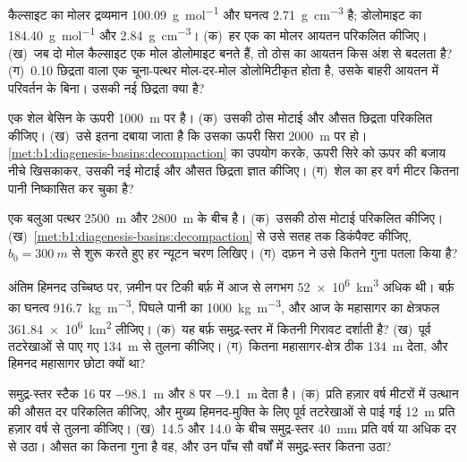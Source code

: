 \begin{exercise}[$\star$]\label{exo:b1:diagenesis-basins:4}
कैल्साइट का मोलर द्रव्यमान \qty{100.09}{g.mol^{-1}} और घनत्व \qty{2.71}{g.cm^{-3}} है; डोलोमाइट का \qty{184.40}{g.mol^{-1}} और \qty{2.84}{g.cm^{-3}}। (क)~हर एक का मोलर आयतन परिकलित कीजिए। (ख)~जब दो मोल कैल्साइट एक मोल डोलोमाइट बनते हैं, तो ठोस का आयतन किस अंश से बदलता है? (ग)~\num{0.10} छिद्रता वाला एक चूना-पत्थर मोल-दर-मोल डोलोमिटीकृत होता है, उसके बाहरी आयतन में परिवर्तन के बिना। उसकी नई छिद्रता क्या है?
\end{exercise}

\begin{exercise}[$\star\star$]\label{exo:b1:diagenesis-basins:5}
एक शेल बेसिन के ऊपरी \qty{1000}{m} पर है। (क)~उसकी ठोस मोटाई और औसत छिद्रता परिकलित कीजिए। (ख)~उसे इतना दबाया जाता है कि उसका ऊपरी सिरा \qty{2000}{m} पर हो। \cref{met:b1:diagenesis-basins:decompaction} का उपयोग करके, ऊपरी सिरे को ऊपर की बजाय नीचे खिसकाकर, उसकी नई मोटाई और औसत छिद्रता ज्ञात कीजिए। (ग)~शेल का हर वर्ग मीटर कितना पानी निष्कासित कर चुका है?
\end{exercise}

\begin{exercise}[$\star\star$]\label{exo:b1:diagenesis-basins:6}
एक बलुआ पत्थर \qty{2500}{m} और \qty{2800}{m} के बीच है। (क)~उसकी ठोस मोटाई परिकलित कीजिए। (ख)~\cref{met:b1:diagenesis-basins:decompaction} से उसे सतह तक डिकंपैक्ट कीजिए, $b_0 = \qty{300}{m}$ से शुरू करते हुए हर न्यूटन चरण लिखिए। (ग)~दफ़न ने उसे कितने गुना पतला किया है?
\end{exercise}

\begin{exercise}[$\star\star$]\label{exo:b1:diagenesis-basins:7}
अंतिम हिमनद उच्चिष्ठ पर, ज़मीन पर टिकी बर्फ़ में आज से लगभग \qty{52e6}{km^3} अधिक थी। बर्फ़ का घनत्व \qty{916.7}{kg.m^{-3}}, पिघले पानी का \qty{1000}{kg.m^{-3}}, और आज के महासागर का क्षेत्रफल \qty{361.84e6}{km^2} लीजिए। (क)~यह बर्फ़ समुद्र-स्तर में कितनी गिरावट दर्शाती है? (ख)~पूर्व तटरेखाओं से पाए गए \qty{134}{m} से तुलना कीजिए। (ग)~कितना महासागर-क्षेत्र ठीक \qty{134}{m} देता, और हिमनद महासागर छोटा क्यों था?
\end{exercise}

\begin{exercise}[$\star\star$]\label{exo:b1:diagenesis-basins:8}
समुद्र-स्तर स्टैक \qty{16}{\ka} पर \qty{-98.1}{m} और \qty{8}{\ka} पर \qty{-9.1}{m} देता है। (क)~प्रति हज़ार वर्ष मीटरों में उत्थान की औसत दर परिकलित कीजिए, और मुख्य हिमनद-मुक्ति के लिए पूर्व तटरेखाओं से पाई गई \qty{12}{m} प्रति हज़ार वर्ष से तुलना कीजिए। (ख)~\qty{14.5}{\ka} और \qty{14.0}{\ka} के बीच समुद्र-स्तर \qty{40}{mm} प्रति वर्ष या अधिक दर से उठा। औसत का कितना गुना है वह, और उन पाँच सौ वर्षों में समुद्र-स्तर कितना उठा?
\end{exercise}

